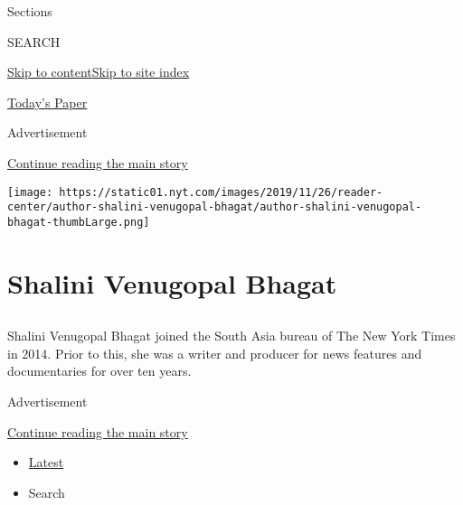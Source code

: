 Sections

SEARCH

\protect\hyperlink{site-content}{Skip to
content}\protect\hyperlink{site-index}{Skip to site index}

\href{https://myaccount.nytimes.com/auth/login?response_type=cookie\&client_id=vi}{}

\href{https://www.nytimes.com/section/todayspaper}{Today's Paper}

Advertisement

\protect\hyperlink{after-top}{Continue reading the main story}

\texttt{[image: https://static01.nyt.com/images/2019/11/26/reader-center/author-shalini-venugopal-bhagat/author-shalini-venugopal-bhagat-thumbLarge.png]}

\hypertarget{shalini-venugopal-bhagat}{%
\section{Shalini Venugopal Bhagat}\label{shalini-venugopal-bhagat}}

\subsection{}

Shalini Venugopal Bhagat joined the South Asia bureau of The New York
Times in 2014. Prior to this, she was a writer and producer for news
features and documentaries for over ten years.

Advertisement

\protect\hyperlink{after-mid1}{Continue reading the main story}

\begin{itemize}
\tightlist
\item
  \protect\hyperlink{stream-panel}{Latest}
\item
  Search
\end{itemize}

